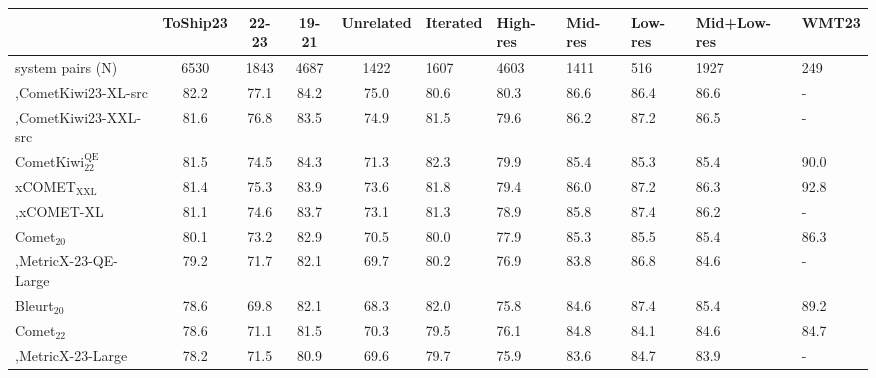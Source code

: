 \begin{tabular}{lcccc}
\toprule
{} & \bf ToShip23 & \bf 22-23 & \bf 19-21 & \bf Unrelated & \bf Iterated & \bf High-res & \bf Mid-res & \bf Low-res & \bf Mid+Low-res & \bf WMT23 \\
\midrule
system pairs (N)                    &         6530 &      1843 &      4687 &          1422 &         1607 &         4603 &        1411 &         516 &            1927 &       249 \\
,CometKiwi23-XL-src                 &         82.2 &      77.1 &      84.2 &          75.0 &         80.6 &         80.3 &        86.6 &        86.4 &            86.6 &         - \\
,CometKiwi23-XXL-src                &         81.6 &      76.8 &      83.5 &          74.9 &         81.5 &         79.6 &        86.2 &        87.2 &            86.5 &         - \\
CometKiwi$_\textrm{22}^\textrm{QE}$ &         81.5 &      74.5 &      84.3 &          71.3 &         82.3 &         79.9 &        85.4 &        85.3 &            85.4 &      90.0 \\
xCOMET$_\textrm{XXL}$               &         81.4 &      75.3 &      83.9 &          73.6 &         81.8 &         79.4 &        86.0 &        87.2 &            86.3 &      92.8 \\
,xCOMET-XL                          &         81.1 &      74.6 &      83.7 &          73.1 &         81.3 &         78.9 &        85.8 &        87.4 &            86.2 &         - \\
Comet$_\textrm{20}$                 &         80.1 &      73.2 &      82.9 &          70.5 &         80.0 &         77.9 &        85.3 &        85.5 &            85.4 &      86.3 \\
,MetricX-23-QE-Large                &         79.2 &      71.7 &      82.1 &          69.7 &         80.2 &         76.9 &        83.8 &        86.8 &            84.6 &         - \\
Bleurt$_\textrm{20}$                &         78.6 &      69.8 &      82.1 &          68.3 &         82.0 &         75.8 &        84.6 &        87.4 &            85.4 &      89.2 \\
Comet$_\textrm{22}$                 &         78.6 &      71.1 &      81.5 &          70.3 &         79.5 &         76.1 &        84.8 &        84.1 &            84.6 &      84.7 \\
,MetricX-23-Large                   &         78.2 &      71.5 &      80.9 &          69.6 &         79.7 &         75.9 &        83.6 &        84.7 &            83.9 &         - \\

\end{tabular}

